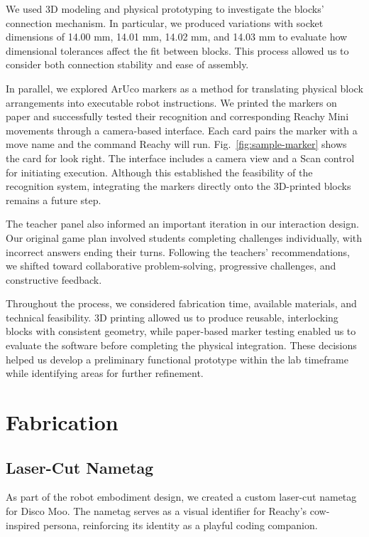 \documentclass[conference]{IEEEtran}
\begin{document}
We used 3D modeling and physical prototyping to investigate the blocks' connection mechanism. In particular, we produced variations with socket dimensions of 14.00 mm, 14.01 mm, 14.02 mm, and 14.03 mm to evaluate how dimensional tolerances affect the fit between blocks. This process allowed us to consider both connection stability and ease of assembly.

In parallel, we explored ArUco markers as a method for translating physical block arrangements into executable robot instructions. We printed the markers on paper and successfully tested their recognition and corresponding Reachy Mini movements through a camera-based interface. Each card pairs the marker with a move name and the command Reachy will run. Fig.~\ref{fig:sample-marker} shows the card for look right. The interface includes a camera view and a Scan control for initiating execution. Although this established the feasibility of the recognition system, integrating the markers directly onto the 3D-printed blocks remains a future step.

The teacher panel also informed an important iteration in our interaction design. Our original game plan involved students completing challenges individually, with incorrect answers ending their turns. Following the teachers' recommendations, we shifted toward collaborative problem-solving, progressive challenges, and constructive feedback.

Throughout the process, we considered fabrication time, available materials, and technical feasibility. 3D printing allowed us to produce reusable, interlocking blocks with consistent geometry, while paper-based marker testing enabled us to evaluate the software before completing the physical integration. These decisions helped us develop a preliminary functional prototype within the lab timeframe while identifying areas for further refinement.



\section{Fabrication}

\subsection{Laser-Cut Nametag}

As part of the robot embodiment design, we created a custom laser-cut nametag for Disco Moo. The nametag serves as a visual identifier for Reachy's cow-inspired persona, reinforcing its identity as a playful coding companion.
\end{document}
